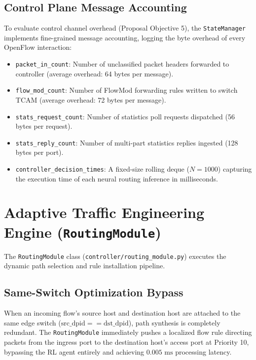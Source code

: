 \subsection{Control Plane Message Accounting}
To evaluate control channel overhead (Proposal Objective 5), the \texttt{StateManager} implements fine-grained message accounting, logging the byte overhead of every OpenFlow interaction:
\begin{itemize}
    \item \texttt{packet\_in\_count}: Number of unclassified packet headers forwarded to controller (average overhead: 64 bytes per message).
    \item \texttt{flow\_mod\_count}: Number of FlowMod forwarding rules written to switch TCAM (average overhead: 72 bytes per message).
    \item \texttt{stats\_request\_count}: Number of statistics poll requests dispatched (56 bytes per request).
    \item \texttt{stats\_reply\_count}: Number of multi-part statistics replies ingested (128 bytes per port).
    \item \texttt{controller\_decision\_times}: A fixed-size rolling deque ($N=1000$) capturing the execution time of each neural routing inference in milliseconds.
\end{itemize}

\section{Adaptive Traffic Engineering Engine (\texttt{RoutingModule})}
The \texttt{RoutingModule} class (\texttt{controller/routing\_module.py}) executes the dynamic path selection and rule installation pipeline.

\subsection{Same-Switch Optimization Bypass}
When an incoming flow's source host and destination host are attached to the same edge switch ($\text{src\_dpid} == \text{dst\_dpid}$), path synthesis is completely redundant. The \texttt{RoutingModule} immediately pushes a localized flow rule directing packets from the ingress port to the destination host's access port at Priority 10, bypassing the RL agent entirely and achieving $0.005\text{ ms}$ processing latency.

